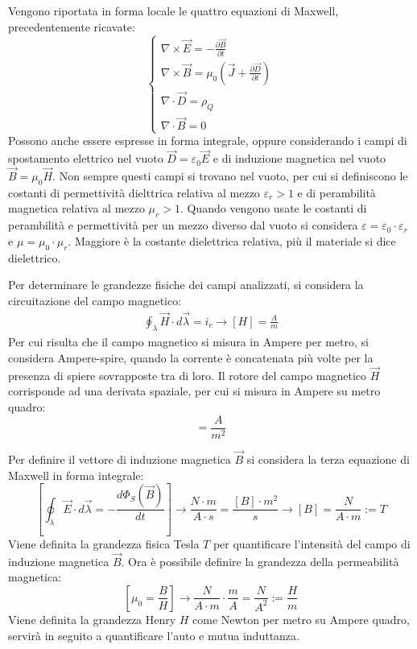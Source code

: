 \documentclass{article}
\numberwithin{equation}{subsection}
\begin{document}
Vengono riportata in forma locale le quattro equazioni di Maxwell, precedentemente ricavate:
\begin{equation*}
    \begin{cases}
        \nabla\times\vec{E}=-\displaystyle\frac{\partial \vec{B}}{\partial t}\\
        \nabla\times\vec{B}=\mu_0\left(\vec{J}+\displaystyle\frac{\partial \vec{D}}{\partial t}\right)\\
        \nabla\cdot\vec{D}=\rho_Q\\
        \nabla\cdot\vec{B}=0
    \end{cases}
\end{equation*}
Possono anche essere espresse in forma integrale, oppure considerando i campi di spostamento elettrico nel vuoto $\vec{D}=\varepsilon_0\vec{E}$ e di induzione magnetica nel 
vuoto $\vec{B}=\mu_0\vec{H}$. Non sempre questi campi si trovano nel vuoto, per cui si definiscono le costanti di permettività dielttrica relativa al mezzo $\varepsilon_r>1$ 
e di perambilità magnetica relativa al mezzo $\mu_r>1$. Quando vengono usate le costanti di perambilità e permettività per un mezzo diverso dal vuoto si considera $\varepsilon=\varepsilon_0\cdot\varepsilon_r$ 
e $\mu=\mu_0\cdot\mu_r$. Maggiore è la costante dielettrica relativa, più il materiale si dice dielettrico. 

Per determinare le grandezze fisiche dei campi analizzati, si considera la circuitazione del campo magnetico:
\begin{gather*}
    \displaystyle\oint_{\lambda}\vec{H}\cdot d\vec{\lambda}=i_c\to[H]=\displaystyle\frac{A}{m}
\end{gather*}
Per cui risulta che il campo magnetico si misura in Ampere per 
metro, si considera Ampere-spire, quando la corrente è concatenata più volte per la presenza di spiere sovrapposte tra di loro. Il rotore del campo magnetico $\vec{H}$ 
corrisponde ad una derivata spaziale, per cui si misura in Ampere su metro quadro:
\begin{equation*}
    [\nabla\times\vec{H}]=\displaystyle\frac{A}{m^2}
\end{equation*}

Per definire il vettore di induzione magnetica $\vec{B}$ si considera la terza equazione di Maxwell in forma integrale:
\begin{equation*}
    \displaystyle\left[\oint_{\lambda}\vec{E}\cdot d\vec\lambda=-\frac{d\Phi_S(\vec{B})}{dt}\right]\to\frac{N\cdot m}{A\cdot s}=\frac{[B]\cdot m^2}{s}\to[B]=\frac{N}{A\cdot m}:=T
\end{equation*}
Viene definita la grandezza fisica Tesla $T$ per quantificare l'intensità del campo di induzione magnetica $\vec{B}$. Ora è possibile definire la grandezza della permeabilità 
magnetica:
\begin{equation*}
    \displaystyle\left[\mu_0=\frac{{B}}{{H}}\right]\to\frac{N}{A\cdot m}\cdot\frac{m}{A}=\frac{N}{A^2}:=\frac{H}{m}
\end{equation*}
Viene definita la grandezza Henry $H$ come Newton per metro su Ampere quadro, servirà in seguito a quantificare l'auto e mutua induttanza. 
\end{document}
